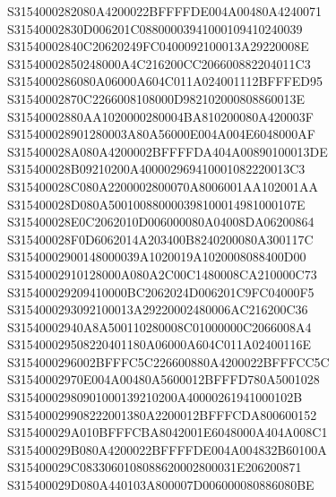 \documentclass[12pt,a4paper]{article}
\begin{document}
\begin{framed}
{S3154000282080A4200022BFFFFDE004A00480A4240071\newline
S31540002830D006201C08800003941000109410240039\newline
S31540002840C20620249FC0400092100013A29220008E\newline
S31540002850248000A4C216200CC206600882204011C3\newline
S3154000286080A06000A604C011A024001112BFFFED95\newline
S31540002870C2266008108000D982102000808860013E\newline
S31540002880AA1020000280004BA810200080A420003F\newline
S315400028901280003A80A56000E004A004E6048000AF\newline
S315400028A080A4200002BFFFFDA404A00890100013DE\newline
S315400028B09210200A400002969410001082220013C3\newline
S315400028C080A2200002800070A8006001AA102001AA\newline
S315400028D080A500100880000398100014981000107E\newline
S315400028E0C2062010D006000080A04008DA06200864\newline
S315400028F0D6062014A203400B8240200080A300117C\newline
S31540002900148000039A1020019A1020008088400D00\newline
S31540002910128000A080A2C00C1480008CA210000C73\newline
S315400029209410000BC2062024D006201C9FC04000F5\newline
S3154000293092100013A29220002480006AC216200C36\newline
S31540002940A8A500110280008C01000000C2066008A4\newline
S315400029508220401180A06000A604C011A02400116E\newline
S3154000296002BFFFC5C226600880A4200022BFFFCC5C\newline
S31540002970E004A00480A5600012BFFFD780A5001028\newline
S31540002980901000139210200A40000261941000102B\newline
S315400029908222001380A2200012BFFFCDA800600152\newline
S315400029A010BFFFCBA8042001E6048000A404A008C1\newline
S315400029B080A4200022BFFFFDE004A004832B60100A\newline
S315400029C0833060108088620002800031E206200871\newline
S315400029D080A440103A800007D006000080886080BE\newline
}
\end{framed}
\end{document}

